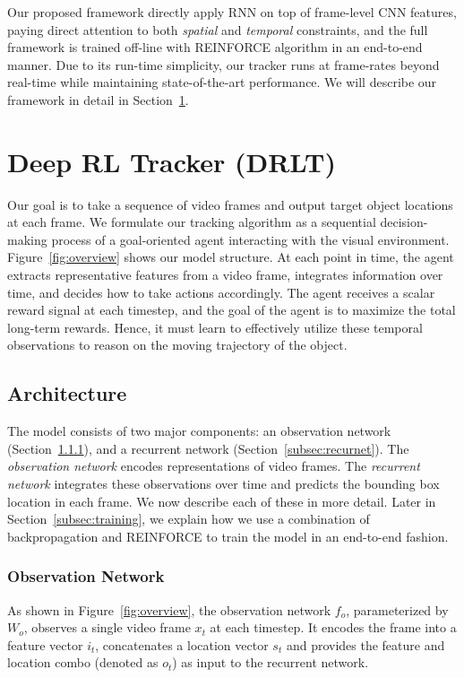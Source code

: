 \documentclass[10pt,twocolumn,letterpaper]{article}
\begin{document}
Our proposed framework directly apply RNN on top of frame-level CNN features, paying direct attention to both \emph{spatial} and \emph{temporal} constraints, and the full framework is trained off-line with REINFORCE algorithm in an end-to-end manner. Due to its run-time simplicity, our tracker runs at frame-rates beyond real-time while maintaining state-of-the-art performance. We will describe our framework in detail in Section~\ref{sec:DRLT}.

\section{Deep RL Tracker (DRLT)}
\label{sec:DRLT}

Our goal is to take a sequence of video frames and output target object locations at each frame. We formulate our tracking algorithm as a sequential decision-making process of a goal-oriented agent interacting with the visual environment. Figure~\ref{fig:overview} shows our model structure. At each point in time, the agent extracts representative features from a video frame, integrates information over time, and decides how to take actions accordingly. The agent receives a scalar reward signal at each timestep, and the goal of the agent is to maximize the total long-term rewards. Hence, it must learn to effectively utilize these temporal observations to reason on the moving trajectory of the object.

\subsection{Architecture}
\label{subsec:arch}

The model consists of two major components: an observation network (Section~\ref{subsec:obsernet}), and a recurrent network (Section~\ref{subsec:recurnet}). The \emph{observation network} encodes representations of video frames. The \emph{recurrent network} integrates these observations over time and predicts the bounding box location in each frame. We now describe each of these in more detail. Later in Section~\ref{subsec:training}, we explain how we use a combination of backpropagation and REINFORCE to train the model in an end-to-end fashion. 
 
\subsubsection{Observation Network}
\label{subsec:obsernet}

As shown in Figure~\ref{fig:overview}, the observation network $f_o$, parameterized by $W_o$, observes a single video frame $x_t$ at each timestep. It encodes the frame into a feature vector $i_t$, concatenates a location vector $s_t$ and provides the feature and location combo (denoted as $o_t$) as input to the recurrent network.
\end{document}
